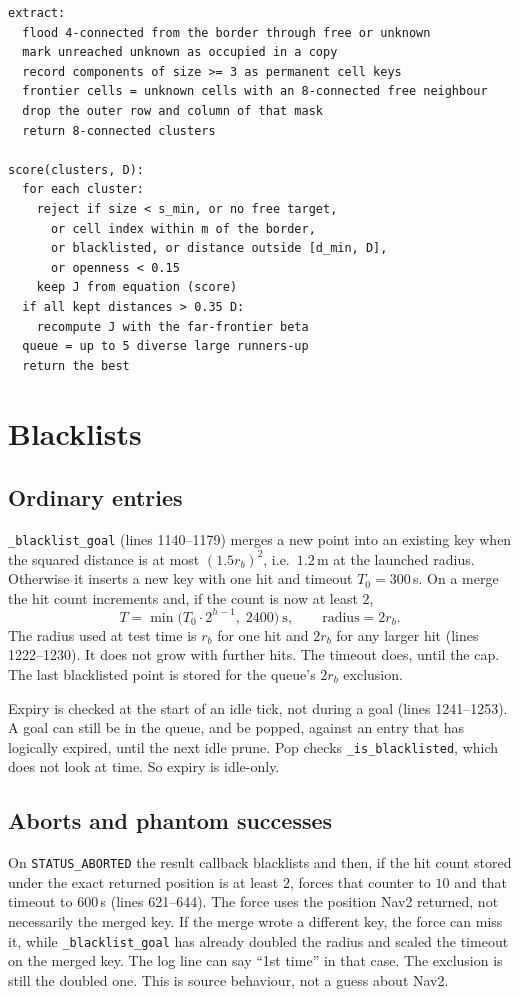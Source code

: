 \documentclass[11pt]{article}
\begin{document}
\begin{lstlisting}[caption={Full scan. Permanent-zone bookkeeping is inside extraction.},label={lst:scan}]
extract:
  flood 4-connected from the border through free or unknown
  mark unreached unknown as occupied in a copy
  record components of size >= 3 as permanent cell keys
  frontier cells = unknown cells with an 8-connected free neighbour
  drop the outer row and column of that mask
  return 8-connected clusters

score(clusters, D):
  for each cluster:
    reject if size < s_min, or no free target,
      or cell index within m of the border,
      or blacklisted, or distance outside [d_min, D],
      or openness < 0.15
    keep J from equation (score)
  if all kept distances > 0.35 D:
    recompute J with the far-frontier beta
  queue = up to 5 diverse large runners-up
  return the best
\end{lstlisting}

\section{Blacklists}
\subsection{Ordinary entries}
\texttt{\_blacklist\_goal} (lines 1140--1179) merges a new point into an existing key when the squared distance is at most $(1.5 r_b)^2$, i.e.\ $1.2$\,m at the launched radius. Otherwise it inserts a new key with one hit and timeout $T_0=300$\,s. On a merge the hit count increments and, if the count is now at least $2$,
\begin{equation}
T=\min\big(T_0\cdot 2^{h-1},\;2400\big)\ \mathrm{s},
\qquad
\mathrm{radius}=2 r_b.
\label{eq:timeout}
\end{equation}
The radius used at test time is $r_b$ for one hit and $2 r_b$ for any larger hit (lines 1222--1230). It does not grow with further hits. The timeout does, until the cap. The last blacklisted point is stored for the queue's $2 r_b$ exclusion.

Expiry is checked at the start of an idle tick, not during a goal (lines 1241--1253). A goal can still be in the queue, and be popped, against an entry that has logically expired, until the next idle prune. Pop checks \texttt{\_is\_blacklisted}, which does not look at time. So expiry is idle-only.

\subsection{Aborts and phantom successes}
On \texttt{STATUS\_ABORTED} the result callback blacklists and then, if the hit count stored under the exact returned position is at least $2$, forces that counter to $10$ and that timeout to $600$\,s (lines 621--644). The force uses the position Nav2 returned, not necessarily the merged key. If the merge wrote a different key, the force can miss it, while \texttt{\_blacklist\_goal} has already doubled the radius and scaled the timeout on the merged key. The log line can say ``1st time'' in that case. The exclusion is still the doubled one. This is source behaviour, not a guess about Nav2.
\end{document}
